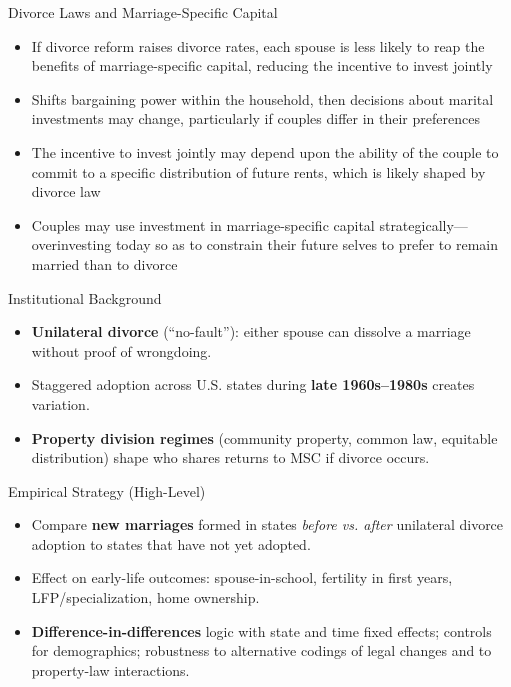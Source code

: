 \documentclass[11pt,notes=hide,aspectratio=169,mathserif]{beamer}
\begin{document}
\begin{frame}{Divorce Laws and Marriage-Specific Capital}
\small
\begin{itemize}
  \item If divorce reform raises divorce rates, each spouse is less likely to reap the benefits of marriage-specific capital,
  reducing the incentive to invest jointly
  \item Shifts bargaining power within the household, then
  decisions about marital investments may change, particularly if couples
  differ in their preferences
  \item  The incentive to invest jointly may depend upon the
  ability of the couple to commit to a specific distribution of future rents,
  which is likely shaped by divorce law
  \item Couples may use investment
  in marriage-specific capital strategically—overinvesting today so as to constrain their future selves to prefer to remain married than to divorce
\end{itemize}
\end{frame}

\begin{frame}{Institutional Background}
\small
\begin{itemize}
  \item \textbf{Unilateral divorce} (``no-fault''): either spouse can dissolve a marriage without proof of wrongdoing.
  \item Staggered adoption across U.S. states during \textbf{late 1960s–1980s} creates variation.
  \item \textbf{Property division regimes} (community property, common law, equitable distribution) shape who shares returns to MSC if divorce occurs.
\end{itemize}
\end{frame}

\begin{frame}{Empirical Strategy (High-Level)}
\small
\begin{itemize}
  \item Compare \textbf{new marriages} formed in states \emph{before vs. after} unilateral divorce adoption to states that have not yet adopted.
  \item Effect on early-life outcomes: spouse-in-school, fertility in first years, LFP/specialization, home ownership.
  \item \textbf{Difference-in-differences} logic with state and time fixed effects; controls for demographics; robustness to alternative codings of legal changes and to property-law interactions.
\end{itemize}
\end{frame}
\end{document}
